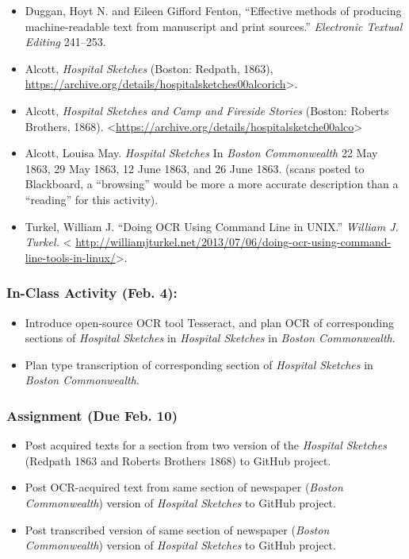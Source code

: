 \documentclass[]{article}
\begin{document}
\begin{itemize}
\itemsep1pt\parskip0pt
\item
  Duggan, Hoyt N. and Eileen Gifford Fenton, ``Effective methods of
  producing machine-readable text from manuscript and print sources.''
  \emph{Electronic Textual Editing} 241--253.
\item
  Alcott, \emph{Hospital Sketches} (Boston: Redpath, 1863),
  \url{https://archive.org/details/hospitalsketches00alcorich}\textgreater{}.
\item
  Alcott, \emph{Hospital Sketches and Camp and Fireside Stories}
  (Boston: Roberts Brothers, 1868).
  \textless{}\url{https://archive.org/details/hospitalsketche00alco}\textgreater{}
\item
  Alcott, Louisa May. \emph{Hospital Sketches} In \emph{Boston
  Commonwealth} 22 May 1863, 29 May 1863, 12 June 1863, and 26 June
  1863. (scans posted to Blackboard, a ``browsing'' would be more a more
  accurate description than a ``reading'' for this activity).
\item
  Turkel, William J. ``Doing OCR Using Command Line in UNIX.''
  \emph{William J. Turkel.} \textless{}
  \url{http://williamjturkel.net/2013/07/06/doing-ocr-using-command-line-tools-in-linux/}\textgreater{}.
\end{itemize}

\subsubsection{In-Class Activity (Feb.
4):}\label{in-class-activity-feb.-4}

\begin{itemize}
\itemsep1pt\parskip0pt
\item
  Introduce open-source OCR tool Tesseract, and plan OCR of
  corresponding sections of \emph{Hospital Sketches} in \emph{Hospital
  Sketches} in \emph{Boston Commonwealth}.
\item
  Plan type transcription of corresponding section of \emph{Hospital
  Sketches} in \emph{Boston Commonwealth}.
\end{itemize}

\subsubsection{Assignment (Due Feb. 10)}\label{assignment-due-feb.-10}

\begin{itemize}
\itemsep1pt\parskip0pt
\item
  Post acquired texts for a section from two version of the
  \emph{Hospital Sketches} (Redpath 1863 and Roberts Brothers 1868) to
  GitHub project.
\item
  Post OCR-acquired text from same section of newspaper (\emph{Boston
  Commonwealth}) version of \emph{Hospital Sketches} to GitHub project.
\item
  Post transcribed version of same section of newspaper (\emph{Boston
  Commonwealth}) version of \emph{Hospital Sketches} to GitHub project.
\end{itemize}
\end{document}
